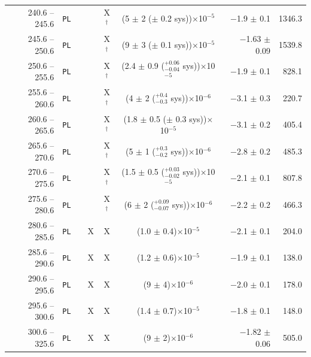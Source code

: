 \documentclass[preprint]{aastex631}
\begin{document}
\begin{table}[ht]
\begin{small}
\begin{tabular}{r | c | c @{\hspace{-3pt}} c @{\hspace{-3pt}} c | c | r | r}
  240.6 -- 245.6  &         \texttt{PL} &  &  & X$^{\dagger}$ & (5 $\pm$ 2 ($\pm$ 0.2 sys))$\times$10$^{-5}$ &                           $-$1.9 $\pm$ 0.1 & 1346.3 \\
  245.6 -- 250.6  &         \texttt{PL} &  &  & X$^{\dagger}$ & (9 $\pm$ 3 ($\pm$ 0.1 sys))$\times$10$^{-5}$ &                         $-$1.63 $\pm$ 0.09 & 1539.8 \\
  250.6 -- 255.6  &         \texttt{PL} &  &  & X$^{\dagger}$ & (2.4 $\pm$ 0.9 ($^{+0.06}_{-0.04}$ sys))$\times$10$^{-5}$ &                           $-$1.9 $\pm$ 0.1 & 828.1 \\
  255.6 -- 260.6  &         \texttt{PL} &  &  & X$^{\dagger}$ & (4 $\pm$ 2 ($^{+0.4}_{-0.3}$ sys))$\times$10$^{-6}$ &                           $-$3.1 $\pm$ 0.3 & 220.7 \\
  260.6 -- 265.6  &         \texttt{PL} &  &  & X$^{\dagger}$ & (1.8 $\pm$ 0.5 ($\pm$ 0.3 sys))$\times$10$^{-5}$ &                           $-$3.1 $\pm$ 0.2 & 405.4 \\
  265.6 -- 270.6  &         \texttt{PL} &  &  & X$^{\dagger}$ & (5 $\pm$ 1 ($^{+0.3}_{-0.2}$ sys))$\times$10$^{-6}$ &                           $-$2.8 $\pm$ 0.2 & 485.3 \\
  270.6 -- 275.6  &         \texttt{PL} &  &  & X$^{\dagger}$ & (1.5 $\pm$ 0.5 ($^{+0.03}_{-0.02}$ sys))$\times$10$^{-5}$ &                           $-$2.1 $\pm$ 0.1 & 807.8 \\
  275.6 -- 280.6  &         \texttt{PL} &  &  & X$^{\dagger}$ & (6 $\pm$ 2 ($^{+0.09}_{-0.07}$ sys))$\times$10$^{-6}$ &                           $-$2.2 $\pm$ 0.2 & 466.3 \\
  280.6 -- 285.6  &         \texttt{PL} &  & X& X&        (1.0 $\pm$ 0.4)$\times$10$^{-5}$ &                           $-$2.1 $\pm$ 0.1 & 204.0 \\
  285.6 -- 290.6  &         \texttt{PL} &  & X& X&        (1.2 $\pm$ 0.6)$\times$10$^{-5}$ &                           $-$1.9 $\pm$ 0.1 & 138.0 \\
  290.6 -- 295.6  &         \texttt{PL} &  & X& X&            (9 $\pm$ 4)$\times$10$^{-6}$ &                           $-$2.0 $\pm$ 0.1 & 178.0 \\
  295.6 -- 300.6  &         \texttt{PL} &  & X& X&        (1.4 $\pm$ 0.7)$\times$10$^{-5}$ &                           $-$1.8 $\pm$ 0.1 & 148.0 \\
  300.6 -- 325.6  &         \texttt{PL} &  & X& X&            (9 $\pm$ 2)$\times$10$^{-6}$ &                         $-$1.82 $\pm$ 0.06 & 505.0 \\

\end{tabular}
\end{small}
\end{table}
\end{document}
